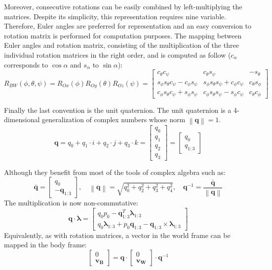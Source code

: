 \documentclass[a4paper, 12pt]{report}
\newcommand\norm[1]{\left\lVert#1\right\rVert}
\begin{document}
Moreover, consecutive rotations can be easily combined by left-multiplying the matrices. Despite its simplicity, this representation requires nine variable. Therefore, Euler angles are preferred for representation and an easy conversion to rotation matrix is performed for computation purposes. The mapping between Euler angles and rotation matrix, consisting of the multiplication of the three individual rotation matrices in the right order, and is computed as follow ($c_\alpha$ corresponds to $\cos{\alpha}$ and $s_\alpha$ to $\sin{\alpha}$):
\[R_{BW}(\phi, \theta, \psi)= R_{Ox}(\phi) R_{Oy}(\theta) R_{Oz}(\psi)  = 
\begin{bmatrix}  c_\theta c_\psi  & c_\theta s_\psi  & -s_\theta  \\ s_\phi s_\theta c_\psi -c_\phi s_\psi  & s_\phi s_\theta s_\psi  + c_\phi c_\psi  & c_\theta s_\phi  \\ c_\phi s_\theta c_\psi +s_\phi s_\psi  & c_\phi s_\theta s_\psi -s_\phi c_\psi  & c_\theta c_\phi  \end{bmatrix} \]

Finally the last convention is the unit quaternion. The unit quaternion is a 4-dimensional generalization of complex numbers whose norm $\norm{\boldsymbol{q}} = 1$.
\[ \boldsymbol{q} =  q_0 + q_1 \cdot i + q_2 \cdot j + q_3 \cdot k = \begin{bmatrix} q_0 \\ q_1 \\ q_2 \\ q_3 \end{bmatrix} = \begin{bmatrix} q_0 \\ q_{1:3} \end{bmatrix} \]

Although they benefit from most of the tools of complex algebra such as:
\[ \boldsymbol{\bar q} = \begin{bmatrix} q_0 \\ -\boldsymbol{q}_{1:3} \end{bmatrix},  \quad \norm{\boldsymbol{q}} = \sqrt{q_0^2 + q_2^2 + q_3^2 + q_4^2}, \quad \boldsymbol{q}^{-1} = \frac{\boldsymbol{\bar q}}{ \norm{\boldsymbol{q}}} \]
The multiplication is now non-commutative:
\[\boldsymbol{q} \cdot \boldsymbol{\lambda} = \begin{bmatrix} q_0p_0 - \boldsymbol{q}^T_{1:3}\boldsymbol{\lambda}_{1:3} \\ q_0\boldsymbol{\lambda}_{1:3} + p_0\boldsymbol{q}_{1:3} - \boldsymbol{q}_{1:3} \times \boldsymbol{\lambda}_{1:3} \end{bmatrix} \]
Equivalently, as with rotation matrices, a vector in the world frame can be mapped in the body frame:
\[ \begin{bmatrix} 0 \\ \boldsymbol{v_B} \end{bmatrix}  = \boldsymbol{q} \cdot \begin{bmatrix} 0 \\ \boldsymbol{v_W} \end{bmatrix} \cdot \boldsymbol{q}^{-1} \]
\end{document}
